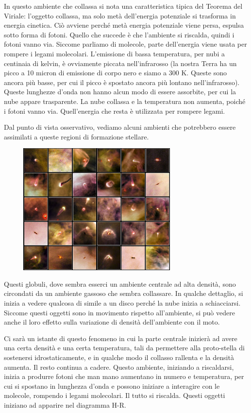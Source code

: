 In questo ambiente che collassa si nota una caratteristica tipica del Teorema del Viriale: l'oggetto collassa, ma solo metà dell'energia potenziale si trasforma in energia cinetica. Ciò avviene perché metà energia potenziale viene persa, espulsa sotto forma di fotoni. Quello che succede è che l'ambiente si riscalda, quindi i fotoni vanno via. Siccome parliamo di molecole, parte dell'energia viene usata per rompere i legami molecolari. L'emissione di bassa temperatura, per nubi a centinaia di kelvin, è ovviamente piccata nell'infrarosso (la nostra Terra ha un picco a 10 micron di emissione di corpo nero e siamo a 300 K. Queste sono ancora più basse, per cui il picco è spostato ancora più lontano nell'infrarosso). Queste lunghezze d'onda non hanno alcun modo di essere assorbite, per cui la nube appare trasparente. La nube collassa e la temperatura non aumenta, poiché i fotoni vanno via. Quell'energia che resta è utilizzata per rompere legami.

Dal punto di vista osservativo, vediamo alcuni ambienti che potrebbero essere assimilati a queste regioni di formazione stellare.

\begin{figure}[H]
    \centering
    \includegraphics[width=8cm]{immagini/core_pre-stellari.png}
    \label{lezione 28 novembre/corestellari.png}
\end{figure}

Questi globuli, dove sembra esserci un ambiente centrale ad alta densità, sono circondati da un ambiente gassoso che sembra collassare. In qualche dettaglio, si inizia a vedere qualcosa di simile a un disco perché la nube inizia a schiacciarsi. Siccome questi oggetti sono in movimento rispetto all'ambiente, si può vedere anche il loro effetto sulla variazione di densità dell'ambiente con il moto.

Ci sarà un istante di questo fenomeno in cui la parte centrale inizierà ad avere una certa densità e una certa temperatura, tali da permettere alla proto-stella di sostenersi idrostaticamente, e in qualche modo il collasso rallenta e la densità aumenta. Il resto continua a cadere. Questo ambiente, iniziando a riscaldarsi, inizia a produrre fotoni che man mano aumentano in numero e temperatura, per cui si spostano in lunghezza d'onda e possono iniziare a interagire con le molecole, rompendo i legami molecolari. Il tutto si riscalda. Questi oggetti iniziano ad apparire nel diagramma H-R.

